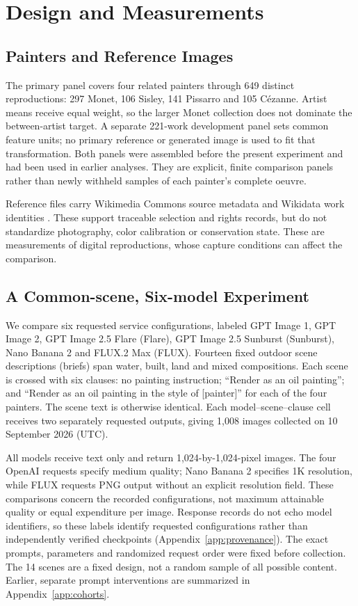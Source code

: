 \section{Design and Measurements}\label{sec:design}
\subsection{Painters and Reference Images}
The primary panel covers four related painters through 649 distinct reproductions: 297 Monet,
106 Sisley, 141 Pissarro and 105 C\'ezanne. Artist means receive equal weight,
so the larger Monet collection does not dominate the between-artist target.
A separate 221-work development panel sets common feature units; no primary
reference or generated image is used to fit that transformation. Both panels
were assembled before the present experiment and had been used in earlier
analyses. They are explicit, finite comparison panels rather than newly withheld
samples of each painter's complete oeuvre.

Reference files carry Wikimedia Commons source metadata and Wikidata work
identities \citep{commonsglam,vrandecic2014wikidata}. These support traceable
selection and rights records, but do not standardize photography, color
calibration or conservation state. These are measurements of digital
reproductions, whose capture conditions can affect the comparison.

\subsection{A Common-scene, Six-model Experiment}
We compare six requested service configurations, labeled GPT Image 1, GPT Image 2, GPT Image 2.5 Flare (Flare),
GPT Image 2.5 Sunburst (Sunburst), Nano Banana 2 and FLUX.2 Max (FLUX).
Fourteen fixed outdoor scene descriptions (briefs) span water,
built, land and mixed compositions. Each scene is crossed with six clauses:
no painting instruction; ``Render as an oil painting''; and ``Render as an oil
painting in the style of [painter]'' for each of the four painters. The scene
text is otherwise identical. Each model--scene--clause cell receives two
separately requested outputs, giving 1,008 images collected on 10 September 2026 (UTC).

All models receive text only and return 1,024-by-1,024-pixel images.
The four OpenAI requests specify medium quality; Nano Banana 2 specifies
1K resolution, while FLUX requests PNG output without an explicit resolution
field. These comparisons concern the recorded
configurations, not maximum attainable quality or equal expenditure per image.
Response records do not echo model identifiers, so these labels identify requested
configurations rather than independently verified checkpoints
(Appendix~\ref{app:provenance}).
The exact prompts, parameters and randomized request order were fixed before
collection. The 14 scenes are a fixed design,
not a random sample of all possible content.
Earlier, separate prompt interventions are summarized in Appendix~\ref{app:cohorts}.

